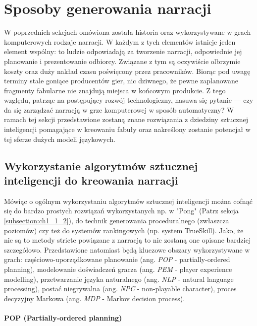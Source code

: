 \graphicspath{{chapters/chapter2/imgs/}}

\chapter{Sposoby generowania narracji}\label{chapter:ch2}

W poprzednich sekcjach omówiona została historia oraz wykorzystywane w grach komputerowych rodzaje
narracji. W każdym z tych elementów istnieje jeden element wspólny: to ludzie odpowiadają za tworzenie
narracji, odpowiednie jej planowanie i prezentowanie odbiorcy. Związane z tym są oczywiście olbrzymie
koszty oraz duży nakład czasu poświęcony przez pracowników. Biorąc pod uwagę terminy stale goniące
producentów gier, nic dziwnego, że pewne zaplanowane fragmenty fabularne nie znajdują miejsca w końcowym
produkcie. Z tego względu, patrząc na postępujący rozwój technologiczny, nasuwa się pytanie ---
czy da się zarządzać narracją w grze komputerowej w sposób automatyczny? W ramach tej sekcji
przedstawione zostaną znane rozwiązania z dziedziny sztucznej inteligencji pomagające w kreowaniu fabuły
oraz nakreślony zostanie potencjał w tej sferze dużych modeli językowych.

\section{Wykorzystanie algorytmów sztucznej inteligencji do kreowania narracji}\label{section:ch2_1}

Mówiąc o ogólnym wykorzystaniu algorytmów sztucznej inteligencji można cofnąć się do bardzo prostych
rozwiązań wykorzystanych np. w "Pong" (Patrz sekcja \ref{subsection:ch1_1_2}), do technik generowania
proceduralnego (zwłaszcza poziomów) czy też do systemów rankingowych (np. system TrueSkill). Jako, że
nie są to metody stricte powiązane z narracją to nie zostaną one opisane bardziej szczegółowo.
Przedstawione natomiast będą kluczowe obszary wykorzystywane w grach: częściowo-uporządkowane planowanie
(ang. \textit{POP} - partially-ordered planning), modelowanie doświadczeń gracza (ang. \textit{PEM} -
player experience modelling), przetwarzanie języka naturalnego (ang. \textit{NLP} - natural language
processing), postać niegrywalna (ang. \textit{NPC} - non-playable character), proces decyzyjny Markowa
(ang. \textit{MDP} - Markov decision process).

\subsubsection*{POP (Partially-ordered planning)}


